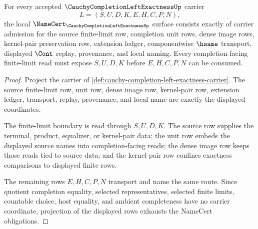 \begin{theorem}
\label{thm:cauchy-completion-left-exactness-namecert-obligations}
For every accepted $\CauchyCompletionLeftExactnessUp$ carrier
$$
L=(S,U,D,K,E,H,C,P,N),
$$
the local $\NameCert_{\CauchyCompletionLeftExactnessUp}$ surface consists exactly of carrier admission for the source finite-limit row, completion unit rows, dense image rows, kernel-pair preservation row, extension ledger, componentwise $\hsame$ transport, displayed $\Cont$ replay, provenance, and local naming. Every completion-facing finite-limit read must expose $S,U,D,K$ before $E,H,C,P,N$ can be consumed.
\end{theorem}
\begin{proof}
Project the carrier of \autoref{def:cauchy-completion-left-exactness-carrier}. The source finite-limit row, unit row, dense image row, kernel-pair row, extension ledger, transport, replay, provenance, and local name are exactly the displayed coordinates.

The finite-limit boundary is read through $S,U,D,K$. The source row supplies the terminal, product, equalizer, or kernel-pair data; the unit row embeds the displayed source names into completion-facing reads; the dense image row keeps those reads tied to source data; and the kernel-pair row confines exactness comparisons to displayed finite rows.

The remaining rows $E,H,C,P,N$ transport and name the same route. Since quotient completion equality, selected representatives, selected finite limits, countable choice, host equality, and ambient completeness have no carrier coordinate, projection of the displayed rows exhausts the NameCert obligations.
\end{proof}

